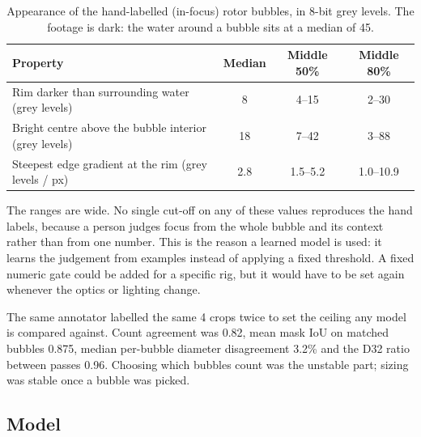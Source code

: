 \begin{table}[htbp]
\centering
\small
\caption{Appearance of the hand-labelled (in-focus) rotor bubbles, in 8-bit
grey levels. The footage is dark: the water around a bubble sits at a
median of 45.}
\label{tab:focus}
\begin{tabular}{@{}lccc@{}}
\toprule
Property & Median & Middle 50\% & Middle 80\% \\
\midrule
Rim darker than surrounding water (grey levels) & 8 & 4--15 & 2--30 \\
Bright centre above the bubble interior (grey levels) & 18 & 7--42 & 3--88 \\
Steepest edge gradient at the rim (grey levels / px) & 2.8 & 1.5--5.2 & 1.0--10.9 \\
\bottomrule
\end{tabular}
\end{table}

The ranges are wide. No single cut-off on any of these values reproduces
the hand labels, because a person judges focus from the whole bubble and
its context rather than from one number. This is the reason a learned
model is used: it learns the judgement from examples instead of applying a
fixed threshold. A fixed numeric gate could be added for a specific rig,
but it would have to be set again whenever the optics or lighting change.

The same annotator labelled the same 4 crops twice to set the ceiling
any model is compared against. Count agreement was 0.82, mean mask IoU
on matched bubbles 0.875, median per-bubble diameter disagreement 3.2\%
and the D32 ratio between passes 0.96. Choosing which bubbles count was
the unstable part; sizing was stable once a bubble was picked.

\hypertarget{model}{%
\subsection{Model}\label{model}}



